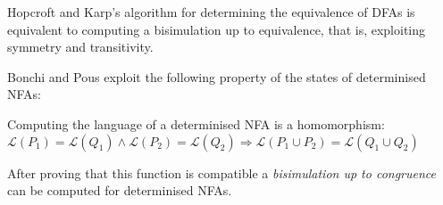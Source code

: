Hopcroft and Karp's algorithm for determining the equivalence of DFAs is
equivalent to computing a bisimulation up to equivalence, that is, exploiting
symmetry and transitivity.

Bonchi and Pous exploit the following property of the states of determinised NFAs:

\begin{corollary}
  Computing the language of a determinised NFA is a homomorphism:\\
  $\mathcal{L}(P_1) = \mathcal{L}(Q_1) \land \mathcal{L}(P_2) = \mathcal{L}(Q_2)
    \Rightarrow \mathcal{L}(P_1 \cup P_2) = \mathcal{L}(Q_1 \cup Q_2)$
\end{corollary}

After proving that this function is compatible a
\textit{bisimulation up to congruence} can be computed for determinised NFAs.
